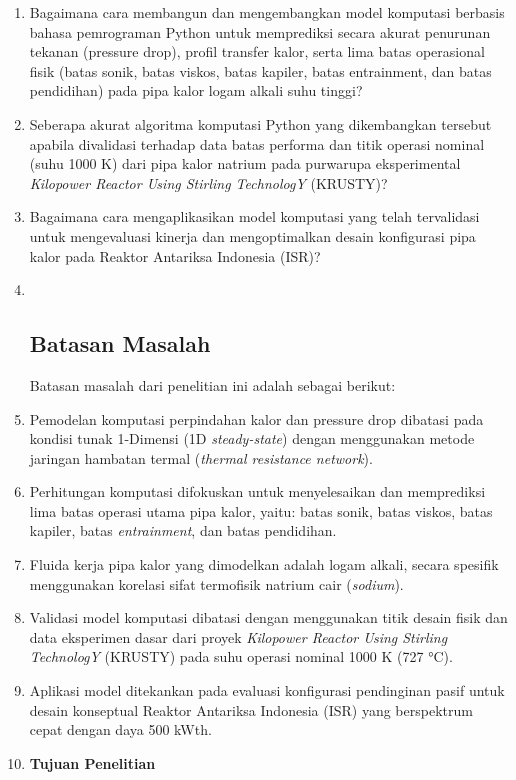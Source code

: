 \documentclass[
]{article}
\begin{document}
\begin{enumerate}
\def\labelenumi{\arabic{enumi}.}
\item
  Bagaimana cara membangun dan mengembangkan model komputasi berbasis
  bahasa pemrograman Python untuk memprediksi secara akurat penurunan
  tekanan (pressure drop), profil transfer kalor, serta lima batas
  operasional fisik (batas sonik, batas viskos, batas kapiler, batas
  entrainment, dan batas pendidihan) pada pipa kalor logam alkali suhu
  tinggi?
\item
  Seberapa akurat algoritma komputasi Python yang dikembangkan tersebut
  apabila divalidasi terhadap data batas performa dan titik operasi
  nominal (suhu 1000 K) dari pipa kalor natrium pada purwarupa
  eksperimental \emph{Kilopower Reactor Using Stirling TechnologY}
  (KRUSTY)?
\item
  Bagaimana cara mengaplikasikan model komputasi yang telah tervalidasi
  untuk mengevaluasi kinerja dan mengoptimalkan desain konfigurasi pipa
  kalor pada Reaktor Antariksa Indonesia (ISR)?
\item ~
  \subsection{\texorpdfstring{\textbf{Batasan
  Masalah}}{Batasan Masalah}}\label{batasan-masalah}

  Batasan masalah dari penelitian ini adalah sebagai berikut:
\item
  Pemodelan komputasi perpindahan kalor dan pressure drop dibatasi pada
  kondisi tunak 1-Dimensi (1D \emph{steady-state}) dengan menggunakan
  metode jaringan hambatan termal (\emph{thermal resistance network}).
\item
  Perhitungan komputasi difokuskan untuk menyelesaikan dan memprediksi
  lima batas operasi utama pipa kalor, yaitu: batas sonik, batas viskos,
  batas kapiler, batas \emph{entrainment}, dan batas pendidihan.
\item
  Fluida kerja pipa kalor yang dimodelkan adalah logam alkali, secara
  spesifik menggunakan korelasi sifat termofisik natrium cair
  (\emph{sodium}).
\item
  Validasi model komputasi dibatasi dengan menggunakan titik desain
  fisik dan data eksperimen dasar dari proyek \emph{Kilopower Reactor
  Using Stirling TechnologY} (KRUSTY) pada suhu operasi nominal 1000 K
  (727 °C).
\item
  Aplikasi model ditekankan pada evaluasi konfigurasi pendinginan pasif
  untuk desain konseptual Reaktor Antariksa Indonesia (ISR) yang
  berspektrum cepat dengan daya 500 kWth.
\item
  \textbf{Tujuan Penelitian}


\end{enumerate}
\end{document}
